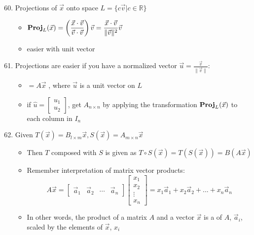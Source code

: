 \documentclass[10pt,letterpaper]{article}
\begin{document}
\begin{enumerate}
\setcounter{enumi}{59}
\item  Projections of $\vec{x}$ onto space $L=\{c \vec{v} | c \in \mathbb{R} \}$

\begin{itemize}
\item $\displaystyle {\bf Proj}_L (\vec{x}) = \left(\frac{\vec{x} \cdot \vec{v} } {\vec{v} \cdot \vec{v}}\right) \vec{v} = \frac{\vec{x} \cdot \vec{v} } {\|\vec{v}\| ^2} \vec{v}$
\item easier with unit vector
\end{itemize}

\item Projections are easier if you have a normalized vector $\vec{u}= \frac{\vec{v}}{\| \vec{v}\|}$:

\begin{itemize}
\item {} $=A \vec{x}$ , where $\vec{u}$ is a unit vector on $L$
\item if $\hat{u}=\begin{bmatrix} u_1 \\ u_2 \end{bmatrix}$, get $A_{n\times n}$ by applying the transformation ${\bf Proj}_L (\vec x)$ to each column in $I_n$
\end{itemize}

\setcounter{enumi}{62}
\item  Given $T( \vec{x} )= B_{l \times m} \vec{x}, S(\vec{x})= A_{m\times n} \vec{x}$

\begin{itemize}
\item Then $T$ composed with $S$ is given as $T \circ S (\vec{x}) = T(S( \vec{x})) = B(A \vec{x})$
\item Remember interpretation of matrix vector products:
      $$ A \vec{x} = \begin{bmatrix} \vec{a}_1 & \vec{a}_2 & \cdots & \vec{a}_n \end{bmatrix} \begin{bmatrix} x_1 \\ x_2 \\  \vdots \\ x_n \end{bmatrix} = x_1 \vec{a}_1 + x_2 \vec{a}_2 + ... + x_n \vec{a}_n$$
\item In other words, the product of a matrix $A$ and a vector $\vec{x}$ is a  of $A$, $\vec{a}_i$, scaled by the elements of $\vec{x}$, $x_i$
\end{itemize}

\end{enumerate}
\end{document}
